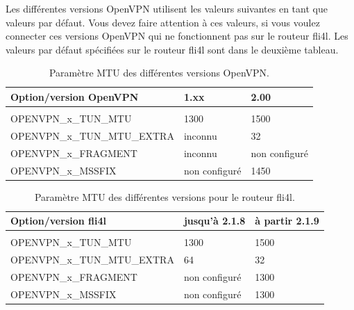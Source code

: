 Les différentes versions OpenVPN utilisent les valeurs suivantes en tant que
valeurs par défaut. Vous devez faire attention à ces valeurs, si vous voulez
connecter ces versions OpenVPN qui ne fonctionnent pas sur le routeur fli4l.
Les valeurs par défaut spécifiées sur le routeur fli4l sont dans le deuxième
tableau.

\begin{table}[htbp]
  \begin{scriptsize}
    \begin{tabular}{lll}
       Option/version OpenVPN       & 1.xx                & 2.00        \\
      \hline                                                    \\
      OPENVPN\_x\_TUN\_MTU          & 1300                & 1500        \\
      OPENVPN\_x\_TUN\_MTU\_EXTRA   & inconnu             & 32          \\
      OPENVPN\_x\_FRAGMENT          & inconnu             & non configuré  \\
      OPENVPN\_x\_MSSFIX            & non configuré       & 1450        \\
    \end{tabular}
  \end{scriptsize}
  \caption{Paramètre MTU des différentes versions OpenVPN.}
\end{table}

\begin{table}[htbp]
  \begin{scriptsize}
    \begin{tabular}{lll}
     Option/version fli4l          & jusqu'à 2.1.8  & à partir  2.1.9  \\
      \hline                                                    \\
      OPENVPN\_x\_TUN\_MTU          & 1300                & 1500        \\
      OPENVPN\_x\_TUN\_MTU\_EXTRA   & 64                  & 32          \\
      OPENVPN\_x\_FRAGMENT          & non configuré       & 1300        \\
      OPENVPN\_x\_MSSFIX            & non configuré       & 1300        \\
    \end{tabular}
  \end{scriptsize}
  \caption{Paramètre MTU des différentes versions pour le routeur fli4l.}
\end{table}

